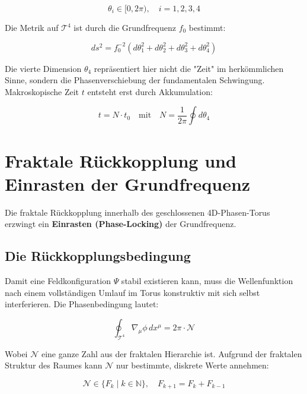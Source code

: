 	\begin{equation}
		\theta_i \in [0, 2\pi),\quad i=1,2,3,4
	\end{equation}
	
	Die Metrik auf $\mathcal{T}^4$ ist durch die Grundfrequenz $f_0$ bestimmt:
	
	\begin{equation}
		ds^2 = f_0^{-2} \left( d\theta_1^2 + d\theta_2^2 + d\theta_3^2 + d\theta_4^2 \right)
	\end{equation}
	
	Die vierte Dimension $\theta_4$ repräsentiert hier nicht die "Zeit" im herkömmlichen Sinne, sondern die Phasenverschiebung der fundamentalen Schwingung. Makroskopische Zeit $t$ entsteht erst durch Akkumulation:
	
	\begin{equation}
		t = N \cdot t_0 \quad \text{mit} \quad N = \frac{1}{2\pi} \oint d\theta_4
	\end{equation}
	
	\section{Fraktale Rückkopplung und Einrasten der Grundfrequenz}
	
	Die fraktale Rückkopplung innerhalb des geschlossenen 4D-Phasen-Torus erzwingt ein \textbf{Einrasten (Phase-Locking)} der Grundfrequenz.
	
	\subsection{Die Rückkopplungsbedingung}
	
	Damit eine Feldkonfiguration $\Psi$ stabil existieren kann, muss die Wellenfunktion nach einem vollständigen Umlauf im Torus konstruktiv mit sich selbst interferieren. Die Phasenbedingung lautet:
	
	\begin{equation}
		\oint_{\mathcal{T}^4} \nabla_{\mu} \phi \, dx^\mu = 2\pi \cdot \mathcal{N}
	\end{equation}
	
	Wobei $\mathcal{N}$ eine ganze Zahl aus der fraktalen Hierarchie ist. Aufgrund der fraktalen Struktur des Raumes kann $\mathcal{N}$ nur bestimmte, diskrete Werte annehmen:
	
	\begin{equation}
		\mathcal{N} \in \{F_k \mid k \in \mathbb{N}\}, \quad F_{k+1} = F_k + F_{k-1}
	\end{equation}
	

